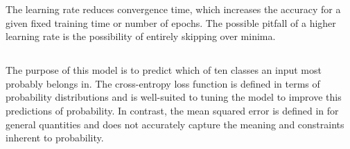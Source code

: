 \documentclass[11pt]{article}
\begin{document}
The learning rate reduces convergence time, which increases the accuracy for a
given fixed training time or number of epochs. The possible pitfall of a higher
learning rate is the possibility of entirely skipping over minima.

\subsection{}  %

The purpose of this model is to predict which of ten classes an input most
probably belongs in. The cross-entropy loss function is defined in terms of
probability distributions and is well-suited to tuning the model to improve this
predictions of probability. In contrast, the mean squared error is defined in
for general quantities and does not accurately capture the meaning and
constraints inherent to probability.
\end{document}
